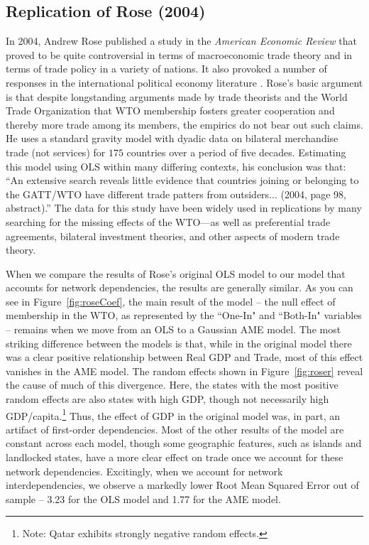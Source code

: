 \documentclass[12pt]{amsart}
\begin{document}
\newpage
\subsection{Replication of Rose (2004)}

In 2004, Andrew Rose published a study in the \textit{American Economic Review} \nocite{rose:2004} that proved to be quite controversial in terms of macroeconomic trade theory and in terms of trade policy in a variety of nations. It also provoked a number of responses in the international political economy literature \cite{tomz:etal:2007,ward:etal:2013}.  Rose's basic argument is that despite longstanding arguments made by trade theorists and the World Trade Organization that WTO membership fosters greater cooperation and thereby more trade among its members, the empirics do not bear out such claims. He uses a standard gravity model with dyadic data on bilateral merchandise trade (not services) for $175$ countries over a period of five decades. Estimating this model using OLS within many differing contexts, his conclusion was that: ``An extensive search reveals little evidence that countries joining or belonging to the GATT/WTO have different trade patters from outsiders... (2004, page 98, abstract).''  The data for this study have been widely used in replications by many searching for the missing effects of the WTO---as well as preferential trade agreements, bilateral investment theories, and other aspects of modern trade theory.  

When we compare the results of Rose's original OLS model to our model that accounts for network dependencies, the results are generally similar. As you can see in Figure~\ref{fig:roseCoef}, the main result of the model -- the null effect of membership in the WTO, as represented by the ``One-In" and ``Both-In" variables -- remains when we move from an OLS to a Gaussian AME model. The most striking difference between the models is that, while in the original model there was a clear positive relationship between Real GDP and Trade, most of this effect vanishes in the AME model. The random effects shown in Figure~\ref{fig:roser} reveal the cause of much of this divergence. Here, the states with the most positive random effects are also states with high GDP, though not necessarily high GDP/capita.\footnote{Note: Qatar exhibits strongly negative random effects.} Thus, the effect of GDP in the original model was, in part, an artifact of first-order dependencies. Most of the other results of the model are constant across each model, though some geographic features, such as islands and landlocked states, have a more clear effect on trade once we account for these network dependencies. Excitingly, when we account for network interdependencies, we observe a markedly lower Root Mean Squared Error out of sample -- 3.23 for the OLS model and 1.77 for the AME model.
\end{document}
